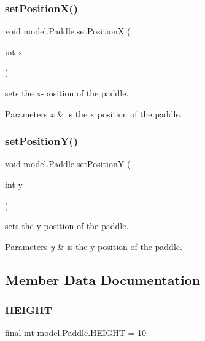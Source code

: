 \subsubsection{\texorpdfstring{set\+Position\+X()}{setPositionX()}}
{\footnotesize\ttfamily void model.\+Paddle.\+set\+PositionX (\begin{DoxyParamCaption}\item[{int}]{x }\end{DoxyParamCaption})}



sets the x-\/position of the paddle. 


\begin{DoxyParams}{Parameters}
{\em x} & is the x position of the paddle. \\
\hline
\end{DoxyParams}
\hypertarget{classmodel_1_1_paddle_a10161bfb478bcdeaf8fbfdac544c10f8}{}\label{classmodel_1_1_paddle_a10161bfb478bcdeaf8fbfdac544c10f8} 
\subsubsection{\texorpdfstring{set\+Position\+Y()}{setPositionY()}}
{\footnotesize\ttfamily void model.\+Paddle.\+set\+PositionY (\begin{DoxyParamCaption}\item[{int}]{y }\end{DoxyParamCaption})}



sets the y-\/position of the paddle. 


\begin{DoxyParams}{Parameters}
{\em y} & is the y position of the paddle. \\
\hline
\end{DoxyParams}


\subsection{Member Data Documentation}
\hypertarget{classmodel_1_1_paddle_a2e269d6e61b7b809c3b90c2007994fcf}{}\label{classmodel_1_1_paddle_a2e269d6e61b7b809c3b90c2007994fcf} 
\subsubsection{\texorpdfstring{H\+E\+I\+G\+HT}{HEIGHT}}
{\footnotesize\ttfamily final int model.\+Paddle.\+H\+E\+I\+G\+HT = 10\hspace{0.3cm}{\ttfamily [private]}}

